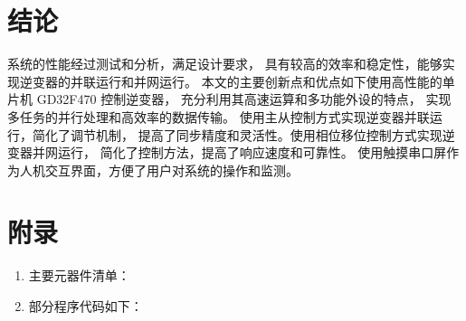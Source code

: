 \documentclass[a4paper,12pt]{article}
\begin{document}
\section{结论}
系统的性能经过测试和分析，满足设计要求，
具有较高的效率和稳定性，能够实现逆变器的并联运行和并网运行。
本文的主要创新点和优点如下使用高性能的单片机 GD32F470 控制逆变器，
充分利用其高速运算和多功能外设的特点，
实现多任务的并行处理和高效率的数据传输。
使用主从控制方式实现逆变器并联运行，简化了调节机制，
提高了同步精度和灵活性。使用相位移位控制方式实现逆变器并网运行，
简化了控制方法，提高了响应速度和可靠性。
使用触摸串口屏作为人机交互界面，方便了用户对系统的操作和监测。

\newpage

\appendix
\section{附录}
\begin{enumerate}
    \item 主要元器件清单：
    \item 部分程序代码如下：
\end{enumerate}

\end{document}
